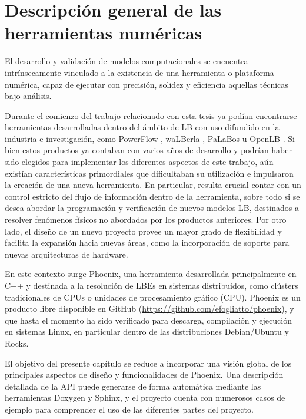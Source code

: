 \chapter{Descripci\'on general de las herramientas num\'ericas}

El desarrollo y validaci\'on de modelos computacionales se encuentra intr\'insecamente vinculado a la existencia de una herramienta o plataforma num\'erica, capaz de ejecutar con precisi\'on, solidez y eficiencia aquellas t\'ecnicas bajo an\'alisis. 

Durante el comienzo del trabajo relacionado con esta tesis ya pod\'ian encontrarse herramientas desarrolladas dentro del \'ambito de LB con uso difundido en la industria e investigaci\'on, como PowerFlow \cite{noauthor_powerflow_nodate}, waLBerla \cite{noauthor_walberla_nodate}, PaLaBos \cite{latt_palabos_2020} u OpenLB \cite{noauthor_openlb_nodate}. Si bien estos productos ya contaban con varios a\~nos de desarrollo y podr\'ian haber sido elegidos para implementar los diferentes aspectos de este trabajo, a\'un exist\'ian caracter\'isticas primordiales que dificultaban su utilizaci\'on e impulsaron la creaci\'on de una nueva herramienta. En particular, resulta crucial contar con un control estricto del flujo de informaci\'on dentro de la herramienta, sobre todo si se desea abordar la programaci\'on y verificaci\'on de nuevos modelos LB, destinados a resolver fen\'omenos f\'isicos no abordados por los productos anteriores. Por otro lado, el dise\~no de un nuevo proyecto provee un mayor grado de flexibilidad y facilita la expansi\'on hacia nuevas \'areas, como la incorporaci\'on de soporte para nuevas arquitecturas de hardware.

En este contexto surge Phoenix, una herramienta desarrollada principalmente en C++ y destinada a la resoluci\'on de LBEs en sistemas distribuidos, como cl\'usters tradicionales de CPUs o unidades de procesamiento gr\'afico (CPU). Phoenix es un producto libre disponible en GitHub (\url{https://github.com/efogliatto/phoenix}), y que hasta el momento ha sido verificado para descarga, compilaci\'on y ejecuci\'on en sistemas Linux, en particular dentro de las distribuciones Debian/Ubuntu y Rocks. 

El objetivo del presente cap\'itulo se reduce a incorporar una visi\'on global de los principales aspectos de dise\~no y funcionalidades de Phoenix. Una descripci\'on detallada de la API puede generarse de forma autom\'atica mediante las herramientas Doxygen y Sphinx, y el proyecto cuenta con numerosos casos de ejemplo para comprender el uso de las diferentes partes del proyecto.



